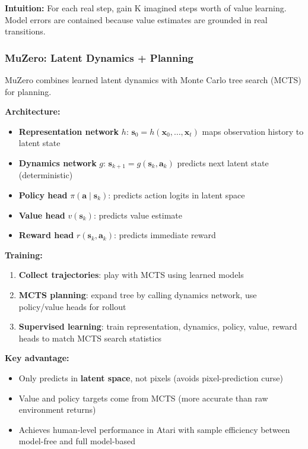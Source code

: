 \textbf{Intuition:} For each real step, gain K imagined steps worth of value learning. Model errors are contained because value estimates are grounded in real transitions.

\subsubsection{MuZero: Latent Dynamics + Planning}

MuZero combines learned latent dynamics with Monte Carlo tree search (MCTS) for planning.

\textbf{Architecture:}
\begin{itemize}
    \item \textbf{Representation network} $h$: $\mathbf{s}_0 = h(\mathbf{x}_0, \ldots, \mathbf{x}_t)$ maps observation history to latent state
    \item \textbf{Dynamics network} $g$: $\mathbf{s}_{k+1} = g(\mathbf{s}_k, \mathbf{a}_k)$ predicts next latent state (deterministic)
    \item \textbf{Policy head} $\pi(\mathbf{a} \mid \mathbf{s}_k)$: predicts action logits in latent space
    \item \textbf{Value head} $v(\mathbf{s}_k)$: predicts value estimate
    \item \textbf{Reward head} $r(\mathbf{s}_k, \mathbf{a}_k)$: predicts immediate reward
\end{itemize}

\textbf{Training:}
\begin{enumerate}
    \item \textbf{Collect trajectories}: play with MCTS using learned models
    \item \textbf{MCTS planning}: expand tree by calling dynamics network, use policy/value heads for rollout
    \item \textbf{Supervised learning}: train representation, dynamics, policy, value, reward heads to match MCTS search statistics
\end{enumerate}

\textbf{Key advantage:}
\begin{itemize}
    \item Only predicts in \textbf{latent space}, not pixels (avoids pixel-prediction curse)
    \item Value and policy targets come from MCTS (more accurate than raw environment returns)
    \item Achieves human-level performance in Atari with sample efficiency between model-free and full model-based
\end{itemize}

